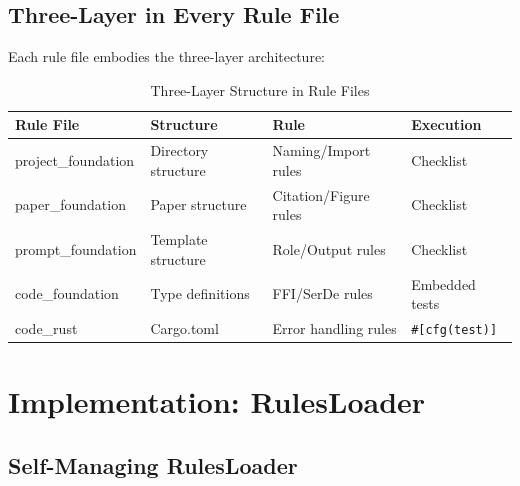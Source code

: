 \documentclass{article}
\begin{document}
\subsection{Three-Layer in Every Rule File}

Each rule file embodies the three-layer architecture:

\begin{table}[h]
\centering
\caption{Three-Layer Structure in Rule Files}
\label{tab:rule-three-layer}
\begin{tabular}{l|l|l|l}
\toprule
\textbf{Rule File} & \textbf{Structure} & \textbf{Rule} & \textbf{Execution} \\
\midrule
project\_foundation & Directory structure & Naming/Import rules & Checklist \\
paper\_foundation & Paper structure & Citation/Figure rules & Checklist \\
prompt\_foundation & Template structure & Role/Output rules & Checklist \\
code\_foundation & Type definitions & FFI/SerDe rules & Embedded tests \\
code\_rust & Cargo.toml & Error handling rules & \texttt{\#[cfg(test)]} \\
\bottomrule
\end{tabular}
\end{table}

\section{Implementation: RulesLoader}

\subsection{Self-Managing RulesLoader}
\end{document}

